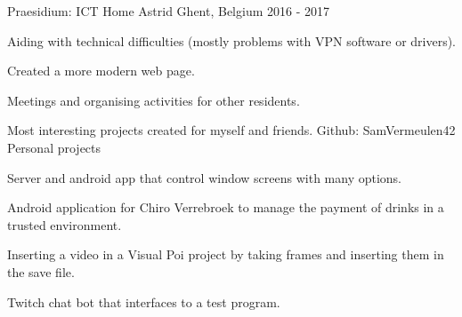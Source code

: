 


\begin{cventries}


\cventry
{Praesidium: ICT} %
{Home Astrid} %
{Ghent, Belgium} %
{2016 - 2017} %
{ %
\begin{cvitems}
\item {Aiding with technical difficulties (mostly problems with VPN software or drivers).}
\item {Created a more modern web page.}
\item {Meetings and organising activities for other residents.}
\end{cvitems}
}


\cventry
{Most interesting projects created for myself and friends. Github: SamVermeulen42}
{Personal projects}
{}
{}
{ %
\begin{cvitems}
\item {Server and android app that control window screens with many options.}
\item {Android application for Chiro Verrebroek to manage the payment of drinks in a trusted environment.}
\item {Inserting a video in a Visual Poi project by taking frames and inserting them in the save file.}
\item {Twitch chat bot that interfaces to a test program.}
\end{cvitems}
}


\end{cventries}